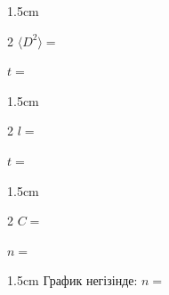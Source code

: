 \begin{answerbox}{1.5cm}
\begin{multicols}{2}
\(\langle D^2\rangle=\)

\columnbreak

\(t=\)
\end{multicols}
\end{answerbox}

\begin{answerbox}{1.5cm}
\begin{multicols}{2}
\(l=\)

\columnbreak

\(t=\)
\end{multicols}
\end{answerbox}

\begin{answerbox}{1.5cm}
\begin{multicols}{2}
\(C=\)

\columnbreak

\(n=\)
\end{multicols}
\end{answerbox}

\begin{answerbox}{1.5cm}
График негізінде: \(n=\)
\end{answerbox}
